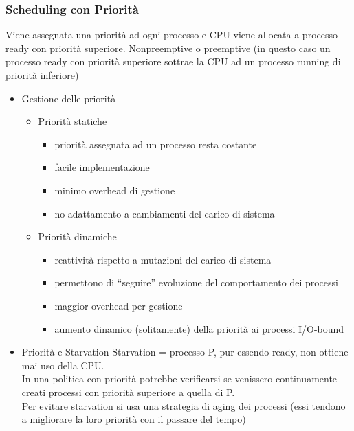 \documentclass{article}
\begin{document}
\subsubsection{Scheduling con Priorità}
Viene assegnata una priorità ad ogni processo e CPU viene allocata a processo ready con priorità superiore.
Nonpreemptive o preemptive (in questo caso un processo ready con priorità superiore sottrae la CPU ad un processo running di priorità inferiore)
\begin{itemize}
    \item Gestione delle priorità
        \begin{itemize}
            \item Priorità statiche
                \begin{itemize}
                    \item priorità assegnata ad un processo resta costante
                    \item facile implementazione
                    \item minimo overhead di gestione
                    \item no adattamento a cambiamenti del carico di sistema
                \end{itemize}
            \item Priorità dinamiche
                \begin{itemize}
                    \item reattività rispetto a mutazioni del carico di sistema
                    \item permettono di “seguire” evoluzione del comportamento dei processi
                    \item maggior overhead per gestione
                    \item aumento dinamico (solitamente) della priorità ai processi I/O-bound
                \end{itemize}
        \end{itemize}
    \item Priorità e Starvation
        Starvation = processo P, pur essendo ready, non ottiene mai uso della CPU.\\
        In una politica con priorità potrebbe verificarsi se venissero continuamente creati processi con priorità superiore a quella di P.\\
        Per evitare starvation si usa una strategia di aging dei processi (essi tendono a migliorare la loro priorità con il passare del tempo)
\end{itemize}
\end{document}
